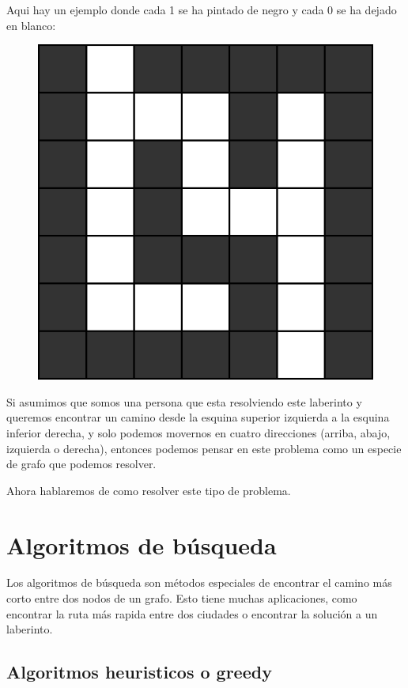 \documentclass{article}
\begin{document}
Aqui hay un ejemplo donde cada 1 se ha pintado de negro y cada 0 se ha dejado en blanco:

\begin{figure}[H]
    \centering
    \includegraphics[width=0.2\paperwidth]{grafo2d}
\end{figure}

Si asumimos que somos una persona que esta resolviendo este laberinto y queremos encontrar un camino desde la esquina superior izquierda a la esquina inferior derecha, y solo podemos movernos en cuatro direcciones (arriba, abajo, izquierda o derecha), entonces podemos pensar en este problema como un especie de grafo que podemos resolver.

Ahora hablaremos de como resolver este tipo de problema.

\section{Algoritmos de búsqueda}

Los algoritmos de búsqueda son métodos especiales de encontrar el camino más corto entre dos nodos de un grafo. Esto tiene muchas aplicaciones, como encontrar la ruta más rapida entre dos ciudades o encontrar la solución a un laberinto.

\subsection{Algoritmos heuristicos o greedy}
\end{document}
